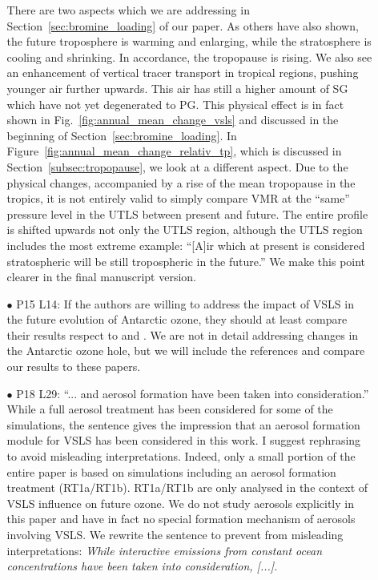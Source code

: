 \begin{itemize}
\begin{itemize}
  There are two aspects which we are addressing in Section~\ref{sec:bromine_loading} of our paper. As others have also shown, the future troposphere is warming and enlarging, while the stratosphere is cooling and shrinking. In accordance, the tropopause is rising. We also see an enhancement of vertical tracer transport in tropical regions, pushing younger air further upwards. This air has still a higher amount of SG which have not yet degenerated to PG. This physical effect is in fact shown in Fig.~\ref{fig:annual_mean_change_vsls} and discussed in the beginning of Section~\ref{sec:bromine_loading}. In Figure~\ref{fig:annual_mean_change_relativ_tp}, which is discussed in Section~\ref{subsec:tropopause}, we look at a different aspect. Due to the physical changes, accompanied by a rise of the mean tropopause in the tropics, it is not entirely valid to simply compare VMR at the ``same'' pressure level in the UTLS between present and future. The entire profile is shifted upwards not only the UTLS region, although the UTLS region includes the most extreme example: ``[A]ir which at present is considered stratospheric will be still tropospheric in the future.'' We make this point clearer in the final manuscript version.
\item[$\bullet$]{\color{blue}P15 L14: If the authors are willing to address the impact of VSLS in the future evolution of Antarctic ozone, they should at least compare their results respect to \citet{GRL:Oman2016} and \citet{ACP:Fernandez2017}.}
  We are not in detail addressing changes in the Antarctic ozone hole, but we will include the references and compare our results to these papers.
\item[$\bullet$]{\color{blue}P18 L29: ``... and aerosol formation have been taken into consideration.'' While a full aerosol treatment has been considered for some of the simulations, the sentence gives the impression that an aerosol formation module for VSLS has been considered in this work. I suggest rephrasing to avoid misleading interpretations.}
  Indeed, only a small portion of the entire paper is based on simulations including an aerosol formation treatment (RT1a/RT1b). RT1a/RT1b are only analysed in the context of VSLS influence on future ozone. We do not study aerosols explicitly in this paper and have in fact no special formation mechanism of aerosols involving VSLS. We rewrite the sentence to prevent from misleading interpretations: \emph{While interactive emissions from constant ocean concentrations have been taken into consideration, [...].}
\end{itemize}
\end{itemize}
\newpage
